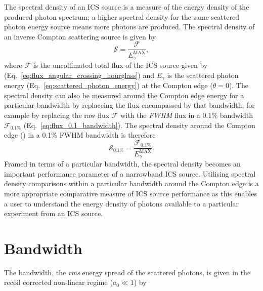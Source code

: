 \documentclass[../main.tex]{subfiles}
\begin{document}
The spectral density of an ICS source is a measure of the energy density of the produced photon spectrum; a higher spectral density for the same scattered photon energy source means more photons are produced. The spectral density of an inverse Compton scattering source is given by
\begin{equation}
\mathcal{S} = \frac{\mathcal{F}}{E_{\gamma}^{\mathrm{MAX}}},
\label{eq:spectral_density}    
\end{equation}
where $\mathcal{F}$ is the uncollimated total flux of the ICS source given by (Eq.~\ref{eq:flux_angular_crossing_hourglass}) and $E_{\gamma}$ is the scattered photon energy (Eq.~\ref{eq:scattered_photon_energy}) at the Compton edge ($\theta = 0$). The spectral density can also be measured around the Compton edge energy for a particular bandwidth by replaceing the flux encompassed by that bandwidth, for example by replacing the raw flux $\mathcal{F}$ with the \textit{FWHM} flux in a 0.1\% bandwidth $\mathcal{F_{\mathrm{0.1\%}}}$ (Eq.~\ref{eq:flux_0.1_bandwidth}).
The spectral density around the Compton edge () in a 0.1\% FWHM bandwidth is therefore
\begin{equation}
\mathcal{S}_{\mathrm{0.1\%}} = \frac{\mathcal{F_{\mathrm{0.1\%}}}}{E_{\gamma}^{\mathrm{MAX}}}.
\label{eq:spectral_density_0.1}    
\end{equation}
Framed in terms of a particular bandwidth, the spectral density becomes an important performance parameter of a narrowband ICS source. Utilising spectral density comparisons within a particular bandwidth around the Compton edge is a more appropriate comparative measure of ICS source performance as this enables a user to understand the energy density of photons available to a particular experiment from an ICS source.    

\section{Bandwidth}
\label{sec:bandwidth}

The bandwidth, the \textit{rms} energy spread of the scattered photons, is given in the recoil corrected non-linear regime ($a_{0}\ll 1$) \cite{ranjan2018simulation} by
\end{document}

